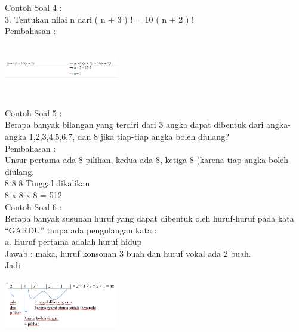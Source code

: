 \documentclass[11pt,fleqn]{book} %
\begin{document}
Contoh Soal 4 :\\

3. Tentukan nilai n dari ( n + 3 ) ! = 10 ( n + 2 ) !\\

Pembahasan :\\


\includegraphics[width = 5cm, height= 3cm]{Pictures/gen6.png}\\


Contoh Soal 5 :\\

Berapa banyak bilangan yang terdiri dari
3 angka dapat dibentuk dari angka-angka 1,2,3,4,5,6,7, dan 8 jika tiap-tiap angka boleh diulang?\\

Pembahasan :\\

Unsur pertama ada 8 pilihan, kedua ada 8, ketiga 8 (karena tiap angka boleh diulang.\\
                                    8          8          8                      
                                    Tinggal dikalikan\\
                                                                                    8 x 8 x 8 = 512\\

Contoh Soal 6 :\\

Berapa banyak susunan huruf yang dapat dibentuk oleh huruf-huruf pada kata “GARDU” tanpa ada pengulangan kata :\\

a.  Huruf pertama adalah huruf hidup\\

Jawab : maka, huruf konsonan 3 buah dan huruf vokal ada 2 buah. \\

Jadi\\

\includegraphics[width = 5cm, height=3cm]{Pictures/soalkaidah1.png}\\
\end{document}
